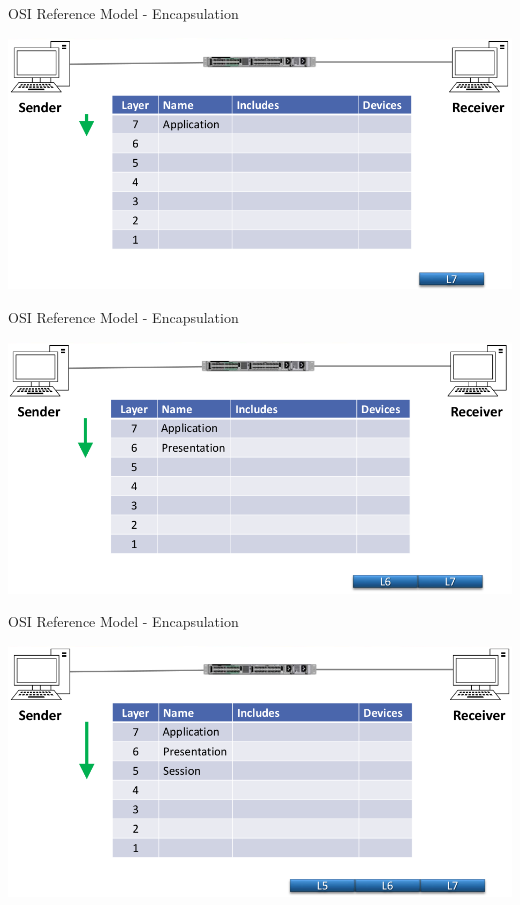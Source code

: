 \documentclass[pdflatex,compress,mathserif]{beamer}
\begin{document}
\begin{frame}{OSI Reference Model - Encapsulation}
	\begin{center}
		\includegraphics[width=\linewidth]{img/img02}
	\end{center}
\end{frame}

\begin{frame}{OSI Reference Model - Encapsulation}
	\begin{center}
		\includegraphics[width=\linewidth]{img/img03}
	\end{center}
\end{frame}

\begin{frame}{OSI Reference Model - Encapsulation}
	\begin{center}
		\includegraphics[width=\linewidth]{img/img04}
	\end{center}
\end{frame}
\end{document}
